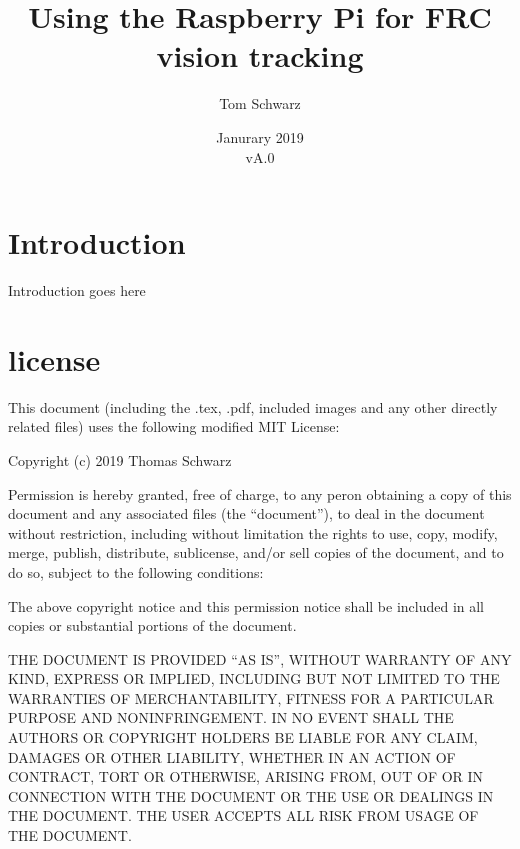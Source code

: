 \documentclass[11pt, titlepage]{article}
\title{Using the Raspberry Pi for FRC vision tracking}
\author{Tom Schwarz}
\date{Janurary 2019\\vA.0} %
\begin{document}
\maketitle

\tableofcontents

\section{Introduction}
Introduction goes here
\pagebreak

	
\section{license}
This document (including the .tex, .pdf, included images and any other directly related files) uses the following modified MIT License:

Copyright (c) 2019 Thomas Schwarz

Permission is hereby granted, free of charge, to any peron obtaining a copy of this document and any associated files (the ``document''), to deal in the document without restriction, including without limitation the rights to use, copy, modify, merge, publish, distribute, sublicense, and/or sell copies of the document, and to do so, subject to the following conditions:

The above copyright notice and this permission notice shall be included in all copies or substantial portions of the document.

THE DOCUMENT IS PROVIDED ``AS IS'', WITHOUT WARRANTY OF ANY KIND, EXPRESS OR IMPLIED, INCLUDING BUT NOT LIMITED TO THE WARRANTIES OF MERCHANTABILITY, FITNESS FOR A PARTICULAR PURPOSE AND NONINFRINGEMENT. IN NO EVENT SHALL THE AUTHORS OR COPYRIGHT HOLDERS BE LIABLE FOR ANY CLAIM, DAMAGES OR OTHER LIABILITY, WHETHER IN AN ACTION OF CONTRACT, TORT OR OTHERWISE, ARISING FROM, OUT OF OR IN CONNECTION WITH THE DOCUMENT OR THE USE OR DEALINGS IN THE DOCUMENT. THE USER ACCEPTS ALL RISK FROM USAGE OF THE DOCUMENT.
\end{document}
